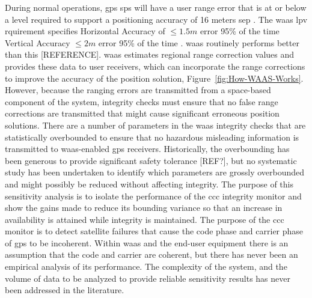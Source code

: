 During normal operations, \ac{gps} \ac{sps} will have a user range error that is at or below a level required to support a positioning accuracy of 16 meters \ac{sep} \citep[p.51]{IS-GPS-200J}.  The \ac{waas} \ac{lpv} rquirement specifies Horizontal Accuracy  of $\leq 1.5m$ error 95\% of the time Vertical Accuracy $\leq 2m$ error 95\% of the time \citep[p.4]{WAAS-PAN-66} \citep[p.34]{FAA-E-2892b}. \ac{waas} routinely performs better than this [REFERENCE]. \ac{waas} estimates regional range correction values and provides these data to user receivers, which can incorporate the range corrections to improve the accuracy of the position solution, Figure~\ref{fig:How-WAAS-Works}. However, because the ranging errors are transmitted from a space-based component of the system, integrity checks must ensure that no false range corrections are transmitted that might cause significant erroneous position solutions.  There are a number of parameters in the \ac{waas} integrity checks that are statistically overbounded to ensure that no hazardous misleading information is transmitted to \ac{waas}-enabled \ac{gps} receivers.  Historically, the overbounding has been generous to provide significant safety tolerance [REF?], but no systematic study has been undertaken to identify which parameters are grossly overbounded and might possibly be reduced without affecting integrity. The purpose of this sensitivity analysis is to isolate the performance of the \ac{ccc} integrity monitor and show the gains made to reduce its bounding variance so that an increase in availability is attained while integrity is maintained. The purpose of the \ac{ccc} monitor is to detect satellite failures that cause the code phase and carrier phase of \ac{gps} to be incoherent.  Within \ac{waas} and the end-user equipment there is an assumption that the code and carrier are coherent, but there has never been an empirical analysis of its performance.  The complexity of the system, and the volume of data to be analyzed to provide reliable sensitivity results has never been addressed in the literature.


